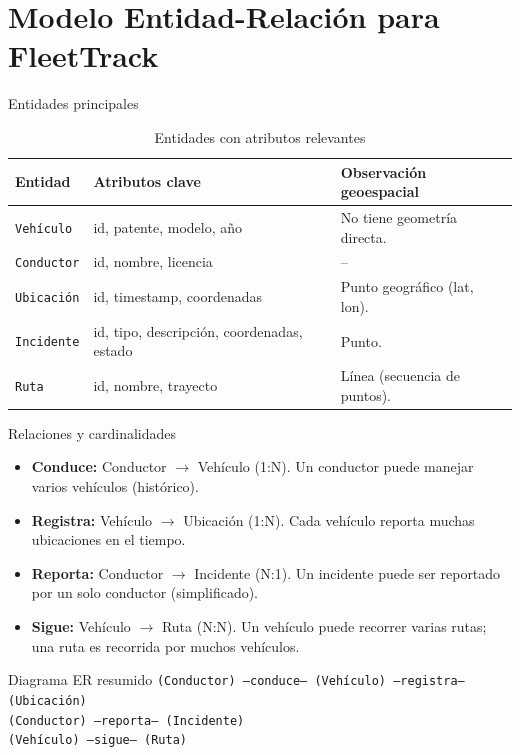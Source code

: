 \documentclass[10pt, aspectratio=169]{beamer}
\begin{document}
\section{Modelo Entidad-Relación para FleetTrack}
\begin{frame}{Entidades principales}
    \begin{table}
        \centering
        \begin{tabular}{llp{5cm}}
            \toprule
            \textbf{Entidad} & \textbf{Atributos clave} & \textbf{Observación geoespacial} \\
            \midrule
            \texttt{Vehículo} & id, patente, modelo, año & No tiene geometría directa. \\
            \texttt{Conductor} & id, nombre, licencia & -- \\
            \texttt{Ubicación} & id, timestamp, \alert{coordenadas} & Punto geográfico (lat, lon). \\
            \texttt{Incidente} & id, tipo, descripción, \alert{coordenadas}, estado & Punto. \\
            \texttt{Ruta} & id, nombre, \alert{trayecto} & Línea (secuencia de puntos). \\
            \bottomrule
        \end{tabular}
        \caption{Entidades con atributos relevantes}
    \end{table}
\end{frame}

\begin{frame}{Relaciones y cardinalidades}
    \begin{itemize}
        \item \textbf{Conduce:} Conductor $\longrightarrow$ Vehículo (1:N).  
              Un conductor puede manejar varios vehículos (histórico).
        \item \textbf{Registra:} Vehículo $\longrightarrow$ Ubicación (1:N).  
              Cada vehículo reporta muchas ubicaciones en el tiempo.
        \item \textbf{Reporta:} Conductor $\longrightarrow$ Incidente (N:1).  
              Un incidente puede ser reportado por un solo conductor (simplificado).
        \item \textbf{Sigue:} Vehículo $\longrightarrow$ Ruta (N:N).  
              Un vehículo puede recorrer varias rutas; una ruta es recorrida por muchos vehículos.
    \end{itemize}
    \begin{exampleblock}{Diagrama ER resumido}
        \centering
        \texttt{(Conductor) ---conduce--- (Vehículo) ---registra--- (Ubicación)} \\
        \texttt{(Conductor) ---reporta--- (Incidente)} \\
        \texttt{(Vehículo) ---sigue--- (Ruta)}
    \end{exampleblock}
\end{frame}
\end{document}
